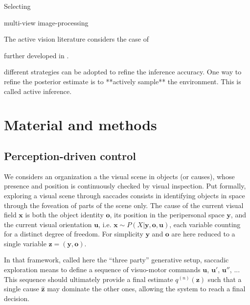 \documentclass[12pt,twoside,openright]{article}
\begin{document}
Selecting 

multi-view image-processing

The active vision literature considers the case of 




further developed in \cite{najemnik2005optimal,butko2010infomax,ahmad2013active,potthast2016active}.



{ different strategies can be adopted to refine the inference accuracy. One way to refine the posterior estimate is to **actively sample** the environment. This is called active inference.} 



\section{Material and methods}

\subsection{Perception-driven control}\label{sec:perception-driven-control}


We considers an organization a the visual scene in objects (or causes), whose presence and position is continuously checked by visual inspection. 
Put formally, exploring a visual scene through saccades consists in identifying objects in space through the foveation of parts of the scene only. The cause of the current visual field $\boldsymbol{x}$ is both the object identity $\boldsymbol{o}$, its position in the peripersonal space $\boldsymbol{y}$, and the current visual orientation $\boldsymbol{u}$, i.e. $\boldsymbol{x} \sim P(X|\boldsymbol{y},\boldsymbol{o},\boldsymbol{u})$, each variable counting for a distinct degree of freedom. For simplicity $\boldsymbol{y}$ and $\boldsymbol{o}$ are here reduced to a single variable $\boldsymbol{z} = (\boldsymbol{y}, \boldsymbol{o})$.%

In that framework, called here the ``three party'' generative setup, saccadic exploration means to define a sequence of visuo-motor commands $\boldsymbol{u}$, $\boldsymbol{u}'$, $\boldsymbol{u}''$, ... This sequence should ultimately provide a final estimate $q^{(n)}(\boldsymbol{z})$ such that a single cause $\hat{\boldsymbol{z}}$ may dominate the other ones, allowing the system to reach a final decision.  
\end{document}
